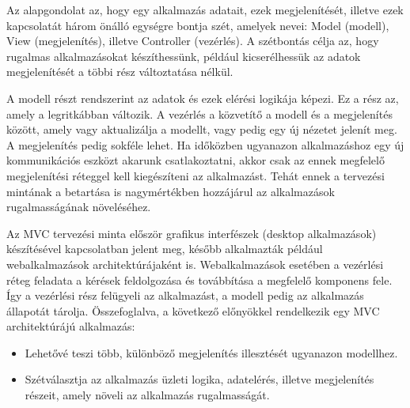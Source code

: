 Az alapgondolat az, hogy egy alkalmazás adatait, ezek megjelenítését, illetve ezek kapcsolatát három önálló egységre bontja szét, amelyek nevei: Model (modell), View (megjelenítés), illetve Controller (vezérlés). A szétbontás célja az, hogy rugalmas alkalmazásokat készíthessünk, például kicserélhessük az adatok megjelenítését a többi rész változtatása nélkül.

A modell részt rendszerint az adatok és ezek elérési logikája képezi. Ez a rész az, amely a legritkábban változik. A vezérlés a közvetítő a modell és a megjelenítés között, amely vagy aktualizálja a modellt, vagy pedig egy új nézetet jelenít meg. A megjelenítés pedig sokféle lehet. Ha időközben ugyanazon alkalmazáshoz egy új kommunikációs eszközt akarunk csatlakoztatni, akkor csak az ennek megfelelő megjelenítési réteggel kell kiegészíteni az alkalmazást. Tehát ennek a tervezési mintának a betartása is nagymértékben hozzájárul az alkalmazások rugalmasságának növeléséhez.


Az MVC tervezési minta először grafikus interfészek (desktop alkalmazások) készítésével kapcsolatban jelent meg, később alkalmazták például webalkalmazások architektúrájaként is. Webalkalmazások esetében a vezérlési réteg feladata a kérések feldolgozása és továbbítása a megfelelő komponens fele. Így a vezérlési rész felügyeli az alkalmazást, a modell pedig az alkalmazás állapotát tárolja. Összefoglalva, a következő előnyökkel rendelkezik egy MVC architektúrájú alkalmazás:
\begin{itemize}
	\item Lehetővé teszi több, különböző megjelenítés illesztését ugyanazon modellhez.
	\item Szétválasztja az alkalmazás üzleti logika, adatelérés, illetve megjelenítés részeit, amely növeli az alkalmazás rugalmasságát. \cite{java-web-tech}
\end{itemize}

